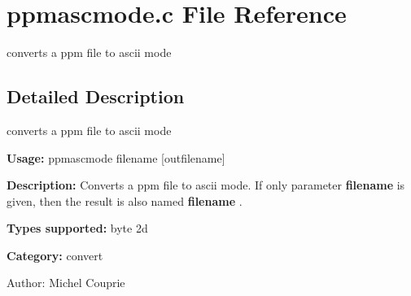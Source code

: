 \section{ppmascmode.c File Reference}
\label{ppmascmode_8c}
converts a ppm file to ascii mode  




\label{_details}
\subsection{Detailed Description}
converts a ppm file to ascii mode 

{\bf Usage:} ppmascmode filename [outfilename]

{\bf Description:} Converts a ppm file to ascii mode. If only parameter {\bf filename} is given, then the result is also named {\bf filename} .

{\bf Types supported:} byte 2d

{\bf Category:} convert

\begin{Desc}
\item[Author:]Michel Couprie \end{Desc}
